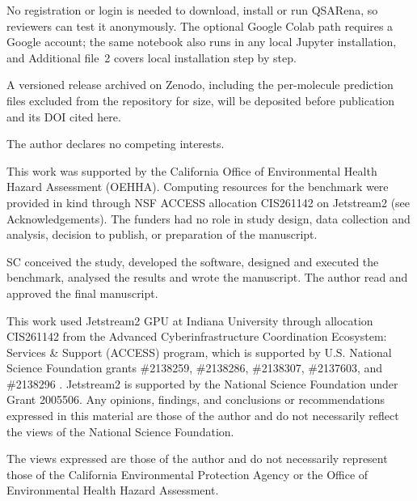 No registration or login is needed to download, install or run QSARena, so reviewers can test it anonymously. The optional Google Colab path requires a Google account; the same notebook also runs in any local Jupyter installation, and Additional file~2 covers local installation step by step.

A versioned release archived on Zenodo, including the per-molecule prediction files excluded from the repository for size, will be deposited before publication and its DOI cited here.

The author declares no competing interests.

This work was supported by the California Office of Environmental Health Hazard Assessment (OEHHA). Computing resources for the benchmark were provided in kind through NSF ACCESS allocation CIS261142 on Jetstream2 (see Acknowledgements). The funders had no role in study design, data collection and analysis, decision to publish, or preparation of the manuscript.

SC conceived the study, developed the software, designed and executed the benchmark, analysed the results and wrote the manuscript. The author read and approved the final manuscript.

This work used Jetstream2 GPU at Indiana University through allocation CIS261142 from the Advanced Cyberinfrastructure Coordination Ecosystem: Services \& Support (ACCESS) program, which is supported by U.S. National Science Foundation grants \#2138259, \#2138286, \#2138307, \#2137603, and \#2138296 \cite{boerner2023access}. Jetstream2 \cite{hancock2021jetstream2} is supported by the National Science Foundation under Grant 2005506. Any opinions, findings, and conclusions or recommendations expressed in this material are those of the author and do not necessarily reflect the views of the National Science Foundation.

The views expressed are those of the author and do not necessarily represent those of the California Environmental Protection Agency or the Office of Environmental Health Hazard Assessment.

